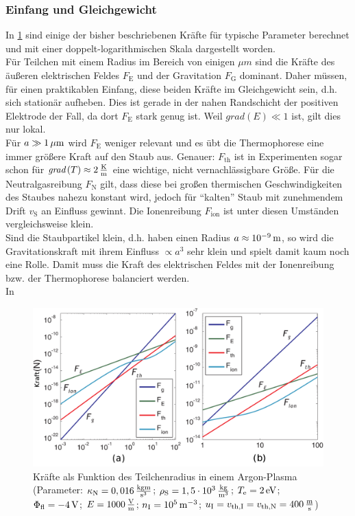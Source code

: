 \documentclass[numbers=noenddot,a4paper]{scrartcl}
\newcommand{\tenpo}[1]{ 10^{#1}}
\newcommand{\ix}[1]{_\text{#1}}
\newcommand{\grad}[1]{\textit{grad}\left(#1\right)}
\begin{document}
			\subsubsection{Einfang und Gleichgewicht}
			
				In \ref{img:kräfte} sind einige der bisher beschriebenen Kräfte für typische Parameter berechnet und mit einer doppelt-logarithmischen Skala dargestellt worden.\\
				Für Teilchen mit einem Radius im Bereich von einigen $\unit{\mu m}$ sind die Kräfte des äußeren elektrischen Feldes $F\ix{E}$ und der Gravitation $F\ix{G}$ dominant. Daher müssen, für einen praktikablen Einfang, diese beiden Kräfte im Gleichgewicht sein, d.h. sich stationär aufheben. Dies ist gerade in der nahen Randschicht der positiven Elektrode der Fall, da dort $F\ix{E}$ stark genug ist. Weil $\grad{E}\ll1$ ist, gilt dies nur lokal.\\
				Für $a\gg\unit[1]{\mu m}$ wird $F\ix{E}$ weniger relevant und es übt die Thermophorese eine immer größere Kraft auf den Staub aus. Genauer: $F\ix{th}$ ist in Experimenten sogar schon für $\grad{T}\approx \unit[2]{\frac{K}{m}}$ eine wichtige, nicht vernachlässigbare Größe. Für die Neutralgasreibung $F\ix{N}$ gilt, dass diese bei großen thermischen Geschwindigkeiten des Staubes nahezu konstant wird, jedoch für "`kalten"' Staub mit zunehmendem Drift $v\ix{S}$ an Einfluss gewinnt. Die Ionenreibung $F\ix{ion}$ ist unter diesen Umständen vergleichsweise klein.\\
				Sind die Staubpartikel klein, d.h. haben einen Radius $a\approx\unit[\tenpo{-9}]{m}$, so wird die Gravitationskraft mit ihrem Einfluss $\propto a^3$ sehr klein und spielt damit kaum noch eine Rolle. Damit muss die Kraft des elektrischen Feldes mit der Ionenreibung bzw. der Thermophorese balanciert werden.\\
				In \
				
					\begin{figure}
						\centering
						\includegraphics[width=1\textwidth,height=0.5\textwidth]{figs/allforcesequlibriummelzer.png}
						\caption{Kräfte als Funktion des Teilchenradius in einem Argon-Plasma (Parameter: $\kappa\ix{N}=\unit[0,016]{\frac{kg m}{s^3}}$;  \mbox{$\rho\ix{S}=\unit[1,5\cdot\tenpo{3}]{\frac{kg}{m^3}}$}; $T\ix{e}=\unit[2]{eV}$; $\Phi\ix{fl}=\unit[-4]{V}$; $E=\unit[1000]{\frac{V}{m}}$; $n\ix{I}=\unit[\tenpo{5}]{m^{-3}}$; $u\ix{I}=v\ix{th,I}=v\ix{th,N}=\unit[400]{\frac{m}{s}}$)} \label{img:kräfte}
					\end{figure}
					
\end{document}
